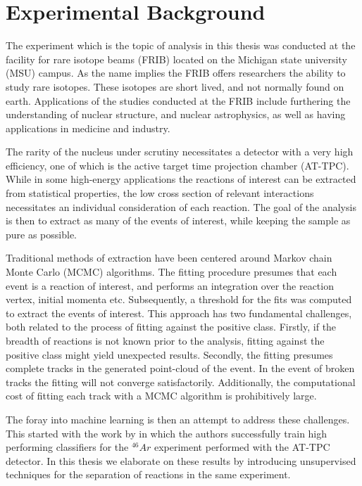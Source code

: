 \chapter{Experimental Background}\label{ch:experimental}

The experiment which is the topic of analysis in this thesis was conducted at the facility for rare isotope beams (FRIB) located on the Michigan state university (MSU) campus. As the name implies the FRIB offers researchers the ability to study rare isotopes. These isotopes are short lived, and not normally found on earth. Applications of the studies conducted at the FRIB include furthering the understanding of nuclear structure, and nuclear astrophysics, as well as having applications in medicine and industry. 

The rarity of the nucleus under scrutiny necessitates a detector with a very high efficiency, one of which is the active target time projection chamber (AT-TPC). While in some high-energy applications the reactions of interest can be extracted from statistical properties, the low cross section of relevant interactions necessitates an individual consideration of each reaction. The goal of the analysis is then to extract as many of the events of interest, while keeping the sample as pure as possible. 

Traditional methods of extraction have been centered around Markov chain Monte Carlo (MCMC) algorithms. The fitting procedure presumes that each event is a reaction of interest, and performs an integration over the reaction vertex, initial momenta etc. Subsequently, a threshold for the fits was computed to extract the events of interest. This approach has two fundamental challenges, both related to the process of fitting against the positive class. Firstly, if the breadth of reactions is not known prior to the analysis, fitting against the positive class might yield unexpected results. Secondly, the fitting presumes complete tracks in the generated point-cloud of the event. In the event of broken tracks the fitting will not converge satisfactorily. Additionally, the computational cost of fitting each track with a MCMC algorithm is prohibitively large. 

The foray into machine learning is then an attempt to address these challenges. This started with the work by \cite{Kuchera2019} in which the authors successfully train high performing classifiers for the ${}^{46}Ar$ experiment performed with the AT-TPC detector. In this thesis we elaborate on these results by introducing unsupervised techniques for the separation of reactions in the same experiment.